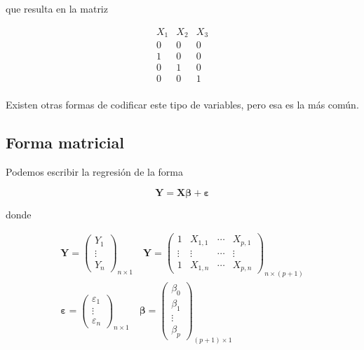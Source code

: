 \documentclass[
  12pt,
]{book}
\theoremstyle{definition}
\theoremstyle{definition}
\theoremstyle{definition}
\theoremstyle{remark}
\begin{document}
que resulta en la matriz

\begin{equation*}
\begin{matrix}
X_{1} & X_{2} & X_{3}\\
0 & 0 & 0 \\
1 & 0 & 0 \\
0 & 1 & 0 \\
0 & 0 & 1 \\
\end{matrix}
\end{equation*}

Existen otras formas de codificar este tipo de variables, pero esa es la más común.

\hypertarget{forma-matricial}{%
\subsection{Forma matricial}\label{forma-matricial}}

Podemos escribir la regresión de la forma

\begin{equation*}
\boldsymbol{Y} = \boldsymbol{X}\boldsymbol{\beta} + \boldsymbol{\varepsilon}
\end{equation*}

donde

\begin{multline*}
\boldsymbol{Y} = 
\begin{pmatrix}
Y_{1} \\
\vdots \\
Y_{n}
\end{pmatrix}_{n\times 1} 
\quad 
\boldsymbol{Y} = 
\begin{pmatrix}
1 & X_{1,1} & \cdots & X_{p,1} \\
\vdots & \vdots & \cdots & \vdots\\
1 & X_{1,n}& \cdots & X_{p,n}
\end{pmatrix}_{n\times (p+1)}
\\
\boldsymbol{\varepsilon} = 
\begin{pmatrix}
\varepsilon_{1} \\
\vdots \\
\varepsilon_{n}
\end{pmatrix}_{n\times 1} 
\quad 
\boldsymbol{\beta} = 
\begin{pmatrix}
\beta_{0} \\
\beta_{1} \\
\vdots \\
\beta_{p}
\end{pmatrix}_{(p+1)\times 1} 
\end{multline*}
\end{document}
